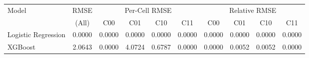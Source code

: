 \begin{tabular}{l c cccc cccc}
\toprule
Model & RMSE & \multicolumn{4}{c}{Per-Cell RMSE} & \multicolumn{4}{c}{Relative RMSE} \\
 & (All) & C00 & C01 & C10 & C11 & C00 & C01 & C10 & C11 \\
\midrule
Logistic Regression & 0.0000 & 0.0000 & 0.0000 & 0.0000 & 0.0000 & 0.0000 & 0.0000 & 0.0000 & 0.0000 \\
XGBoost & 2.0643 & 0.0000 & 4.0724 & 0.6787 & 0.0000 & 0.0000 & 0.0052 & 0.0052 & 0.0000 \\
\bottomrule
\end{tabular}
